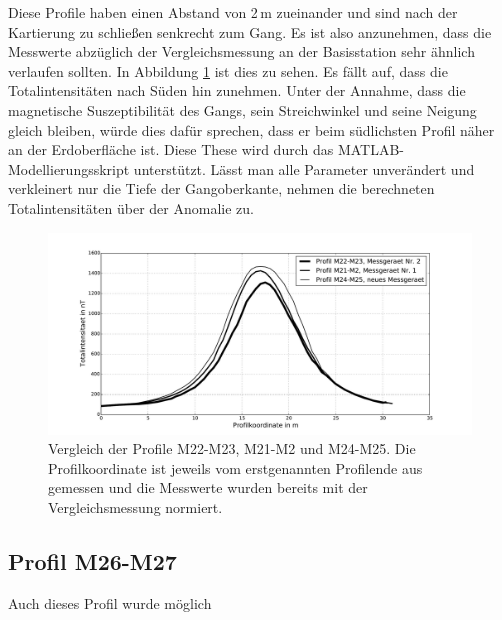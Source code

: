 Diese Profile haben einen Abstand von 2\,m zueinander und sind nach der Kartierung zu schließen senkrecht zum Gang. Es ist also anzunehmen, dass die Messwerte abzüglich der Vergleichsmessung an der Basisstation sehr ähnlich verlaufen sollten. In Abbildung \ref{fig:Vergleich_Profile} ist dies zu sehen. Es fällt auf, dass die Totalintensitäten nach Süden hin zunehmen. Unter der Annahme, dass die magnetische Suszeptibilität des Gangs, sein Streichwinkel und seine Neigung gleich bleiben, würde dies dafür sprechen, dass er beim südlichsten Profil näher an der Erdoberfläche ist. Diese These wird durch das MATLAB-Modellierungsskript unterstützt. Lässt man alle Parameter unverändert und verkleinert nur die Tiefe der Gangoberkante, nehmen die berechneten Totalintensitäten über der Anomalie zu.

\begin{figure}
 \centering
 \includegraphics[width=\textwidth]{fig/Vergleich_nahe_Profile.pdf}
 \caption[Vergleich der Profile M22-M23, M21-M2 und M24-M25]{Vergleich der Profile M22-M23, M21-M2 und M24-M25. Die Profilkoordinate ist jeweils vom erstgenannten Profilende aus gemessen und die Messwerte wurden bereits mit der Vergleichsmessung normiert.}
 \label{fig:Vergleich_Profile}
\end{figure}

\subsection{Profil M26-M27}

Auch dieses Profil wurde möglich

